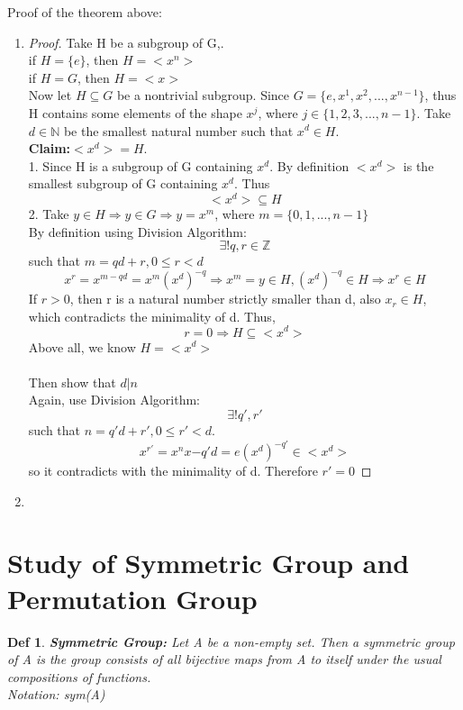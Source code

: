 \documentclass{article}
\newtheorem*{definition}{Def}
\begin{document}
    Proof of the theorem above:
    \begin{enumerate}
        \item 
        \begin{proof}Take H be a subgroup of G,.\\
            if \(H=\{e\}\), then \(H=<x^n>\)\\
            if \(H=G\), then \(H=<x>\)\\
            Now let \(H \subseteq G\) be a nontrivial subgroup. 
            Since \(G=\{e,x^1,x^2,...,x^{n-1}\}\), thus H contains some elements 
            of the shape \(x^j\), where \(j\in \{1,2,3,...,n-1\}\).
            Take \(d\in \mathbb N\) be the smallest natural number such that
            \(x^d\in H\).\\
            \textbf{Claim:}\(<x^d>=H\).\\
            1. Since H is a subgroup of G containing \(x^d\). By definition \(<x^d>\)
            is the smallest subgroup of G containing \(x^d\). Thus \[<x^d>\subseteq H\]
            2. Take \(y \in H \Rightarrow y \in G \Rightarrow y = x^m\), where \(m=\{0,1,...,n-1\}\)\\
            By definition using Division Algorithm:
            \[\exists !q,r \in \mathbb Z\] such that \(m=qd+r, 0\leq r < d\)
            \[x^r=x^{m-qd}=x^m(x^{d})^{-q} \Rightarrow x^m=y \in H, (x^d)^{-q}\in H \Rightarrow x^r \in H \]
            If \(r>0\), then r is a natural number strictly smaller than d, also \(x_r\in H\), which contradicts 
            the minimality of d. Thus, \[r=0 \Rightarrow H\subseteq <x^d>\]
            Above all, we know \(H=<x^d>\)\\
            \\Then show that \(d|n\)\\
            Again, use Division Algorithm:
            \[\exists ! q',r'\]
            such that \(n=q'd+r',0\leq r' <d\).
            \[x^{r'}=x^nx{-q'd}=e(x^{d})^{-q'} \in <x^d>\]
            so it contradicts with the minimality of d. Therefore \(r'=0\)
        \end{proof}
        \item
    \end{enumerate}

    \section{Study of Symmetric Group and Permutation Group}
    \begin{definition}
        \textbf{Symmetric Group:} Let A be a non-empty set. Then 
        a symmetric group of A is the group consists of all bijective maps from A to itself
        under the usual compositions of functions.\\
        Notation: sym(A)
    \end{definition}
    
\end{document}
